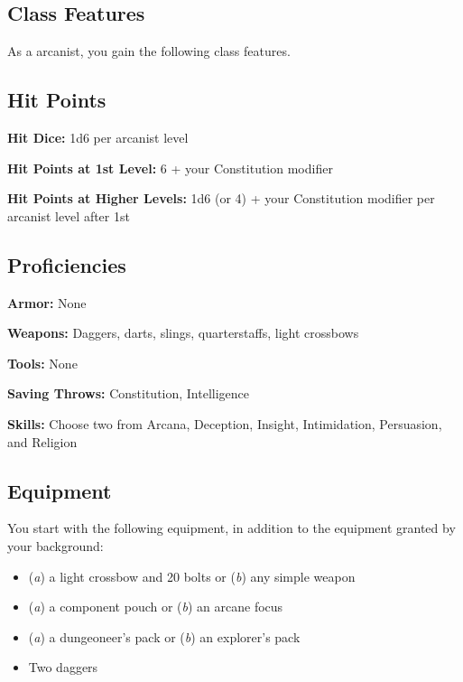 \subsection{Class Features}

As a arcanist, you gain the following class features.

\subsection{Hit Points}

\textbf{Hit Dice:} 1d6 per arcanist level

\textbf{Hit Points at 1st Level:} 6 + your Constitution modifier

\textbf{Hit Points at Higher Levels:} 1d6 (or 4) + your Constitution modifier per arcanist level after 1st

\subsection{Proficiencies}

\textbf{Armor:} None

\textbf{Weapons:} Daggers, darts, slings, quarterstaffs, light crossbows

\textbf{Tools:} None

\textbf{Saving Throws:} Constitution, Intelligence

\textbf{Skills:} Choose two from Arcana, Deception, Insight, Intimidation, Persuasion, and Religion

\subsection{Equipment}

You start with the following equipment, in addition to the equipment granted by your background:
\begin{itemize}
\item (\textit{a}) a light crossbow and 20 bolts or (\textit{b}) any simple weapon
\item (\textit{a}) a component pouch or (\textit{b}) an arcane focus
\item (\textit{a}) a dungeoneer's pack or (\textit{b}) an explorer's pack
\item Two daggers
\end{itemize}

